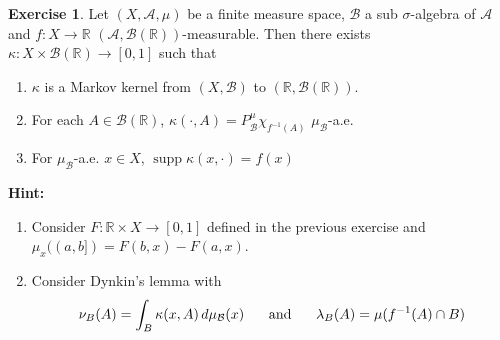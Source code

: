 \documentclass{book}
\theoremstyle{definition}
\newtheorem{ex}[definition]{Exercise}
\newcommand{\kap}{\kappa}
\newcommand{\lam}{\lambda}
\newcommand{\sig}{\sigma}
\newcommand{\R}{\mathbb{R}}
\newcommand{\MA}{\mathcal{A}}
\newcommand{\MB}{\mathcal{B}}
\DeclareMathOperator{\supp}{supp}
\DeclareMathOperator*{\0}{\mbf{0}}
\DeclareMathOperator*{\1}{\mbf{1}}
\newcommand{\dmu}{\, d \mu}
\begin{document}
	\begin{ex}
		Let $(X, \MA, \mu)$ be a finite measure space, $\MB$ a sub $\sig$-algebra of $\MA$ and $f: X \rightarrow \R$ $(\MA, \MB(\R))$-measurable. Then there exists $\kap: X \times \MB(\R) \rightarrow [0,1]$ such that 
		\begin{enumerate}
			\item $\kap$ is a Markov kernel from $(X, \MB)$ to $(\R, \MB(\R))$.
			\item For each $A \in \MB(\R)$, $\kap(\cdot, A) = P^{\mu}_{\MB}\chi_{f^{-1}(A)}$ $\mu_{\MB}$-a.e.
			\item For $\mu_{\MB}$-a.e. $x \in X$, $\supp \kap(x, \cdot) = f(x)$
		\end{enumerate}
		\textbf{Hint:} 
		\begin{enumerate}
			\item Consider $F: \R \times X \rightarrow [0,1]$ defined in the previous exercise and $\mu_x((a,b]) = F(b,x) - F(a,x)$. 
			\item Consider Dynkin's lemma with $$\nu_B(A) = \int_B \kap(x, A) \dmu_{\MB}(x) \hspace{.5cm} \text{ and } \hspace{.5cm} \lam_B(A) = \mu(f^{-1}(A) \cap B)$$
		\end{enumerate}
	\end{ex}
	
\end{document}
